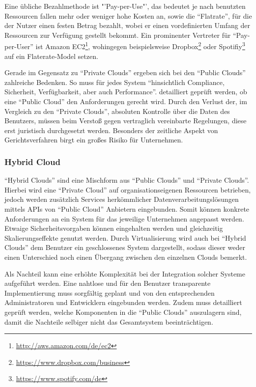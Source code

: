 Eine übliche Bezahlmethode ist "'Pay-per-Use"', das bedeutet je nach benutzten Ressourcen fallen mehr oder weniger hohe Kosten an, sowie die "`Flatrate"', für die der Nutzer einen festen Betrag bezahlt, wobei er einen vordefinierten Umfang der Ressourcen zur Verfügung gestellt bekommt.
Ein prominenter Vertreter für "`Pay-per-User"' ist Amazon EC2\footnote{\url{http://aws.amazon.com/de/ec2}}, wohingegen beispielsweise Dropbox\footnote{\url{https://www.dropbox.com/business}} oder Spotifiy\footnote{\url{https://www.spotify.com/de}} auf ein Flaterate-Model setzen.

Gerade im Gegensatz zu "`Private Clouds"' ergeben sich bei den "`Public Clouds"' zahlreiche Bedenken.
So muss für jedes System "`hinsichtlich Compliance, Sicherheit, Verfügbarkeit, aber auch Performance"'\cite[Seite 40]{hoell11}. detailliert geprüft werden, ob eine "`Public Cloud"' den Anforderungen gerecht wird.
Durch den Verlust der, im Vergleich zu den "`Private Clouds"', absoluten Kontrolle über die Daten des Benutzers, müssen beim Verstoß gegen vertraglich vereinbarte Regelungen, diese erst juristisch durchgesetzt werden\cite[vgl.][Seite 40]{hoell11}.
Besonders der zeitliche Aspekt von Gerichtsverfahren birgt ein großes Risiko für Unternehmen.

\subsubsection{Hybrid Cloud}
"`Hybrid Clouds"' sind eine Mischform aus "`Public Clouds"' und "`Private Clouds"'.
Hierbei wird eine "`Private Cloud"' auf organisationseigenen Ressourcen betrieben, jedoch werden zusätzlich Services herkömmlicher Datenverarbeitungslösungen mittels \acp{API} von "`Public Cloud"' Anbietern eingebunden.
Somit können konkrete Anforderungen an ein System für das jeweilige Unternehmen angepasst werden.
Etwaige Sicherheitsvorgaben können eingehalten werden und gleichzeitig Skalierungseffekte genutzt werden\cite[vgl.][Seite 42]{hoell11}.
Durch Virtualisierung wird auch bei "`Hybrid Clouds"' dem Benutzer ein geschlossenes System dargestellt, sodass dieser weder einen Unterschied noch einen Übergang zwischen den einzelnen Clouds bemerkt\cite[vgl.][Seite 11]{hoell11}.

Als Nachteil kann eine erhöhte Komplexität bei der Integration solcher Systeme aufgeführt werden.
Eine nahtlose und für den Benutzer transparente Implementierung muss sorgfältig geplant und von den entsprechenden Administratoren und Entwicklern eingebunden werden.
Zudem muss detailliert geprüft werden, welche Komponenten in die "`Public Clouds"' auszulagern sind, damit die Nachteile selbiger nicht das Gesamtsystem beeinträchtigen.

